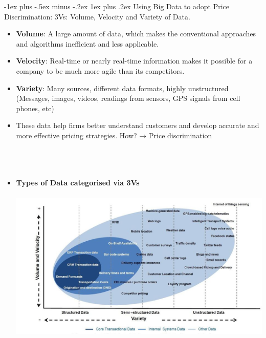 \documentclass[12pt, landscape]{article}
\makeatletter
\renewcommand{\subsubsection}{\@startsection{subsubsection}{3}{0mm}%
                                {-1ex plus -.5ex minus -.2ex}%
                                {1ex plus .2ex}%
                                {\normalfont\small\bfseries}}
\makeatother
\begin{document}
\begin{multicols*}{3}
\subsubsection{Using Big Data to adopt Price Discrimination:}
3Vs: Volume, Velocity and Variety of Data.
\begin{itemize}
\item \textbf{Volume}: A large amount of data, which makes the conventional approaches and algorithms inefficient and less applicable.
\item \textbf{Velocity}: Real-time or nearly real-time information makes it possible for a company to be much more agile than its competitors.
\item \textbf{Variety}: Many sources, different data formats, highly unstructured (Messages, images, videos, readings from sensors, GPS signals from cell phones, etc)
\item These data help firms better understand customers and develop accurate and more effective pricing strategies. How? → Price discrimination
\\ ~\\ ~\\ ~\\
\item \textbf{Types of Data categorised via 3Vs}
~\\ ~\\
\includegraphics[width = \linewidth]{bigData3V}
\end{itemize}



\end{multicols*}
\end{document}
